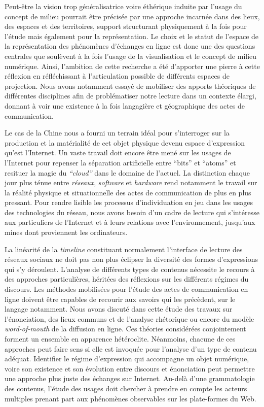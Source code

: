 Peut-être la vision trop généralisatrice voire éthérique induite par l{\textquoteright}usage du concept de milieu pourrait être précisée par une approche incarnée dans des lieux, des espaces et des territoires, support structurant physiquement à la fois pour l{\textquoteright}étude mais également pour la représentation. Le choix et le statut de l'espace de la représentation des phénomènes d'échanges en ligne est donc une des questions centrales que soulèvent à la fois l'usage de la visualisation et le concept de milieu numérique. Ainsi, l'ambition de cette recherche a été d'apporter une pierre à cette réflexion en réfléchissant à l'articulation possible de différents espaces de projection. Nous avons notamment essayé de mobiliser des apports théoriques de différentes disciplines afin de problématiser notre lecture dans un contexte élargi, donnant à voir une existence à la fois langagière et géographique des actes de communication. 


Le cas de la Chine nous a fourni un terrain idéal pour s'interroger sur la production et la matérialité de cet objet physique devenu espace d'expression qu'est l'Internet. Un vaste travail doit encore être mené sur les usages de l'Internet pour repenser  la séparation artificielle entre ``bits'' et ``atoms'' et resituer la magie du \textit{``cloud''} dans le domaine de l'actuel. La distinction chaque jour plus ténue entre \textit{réseaux}, \textit{software} et \textit{hardware} rend notamment le travail sur la réalité physique et situationnelle des actes de communication de plus en plus pressant. Pour rendre lisible les processus d'individuation en jeu dans les usages des technologies du réseau, nous avons besoin d'un cadre de lecture qui s'intéresse aux particuliers de l'Internet et à leurs relations avec l'environnement, jusqu'aux mines dont proviennent les ordinateurs.

La linéarité de la \textit{timeline} constituant normalement l'interface de lecture des réseaux sociaux ne doit pas non plus éclipser la diversité des formes d'expressions qui s'y déroulent. L'analyse de différents types de contenus nécessite le recours à des approches particulières, héritées des réflexions sur les différents régimes du discours. Les méthodes mobilisées pour l'étude des actes de communication en ligne doivent être capables de recourir aux savoirs qui les précèdent, sur le langage notamment. Nous avons discuté dans cette étude des travaux sur l'énonciation, des lieux communs et de l'analyse rhétorique ou encore du modèle \textit{word-of-mouth} de la diffusion en ligne. Ces théories considérées conjointement forment un ensemble en apparence hétéroclite. Néanmoins, chacune de ces approches peut faire sens si elle est invoquée pour l'analyse d'un type de contenu adéquat. Identifier le régime d'expression qui accompagne un objet numérique, voire son existence et son évolution entre discours et énonciation peut permettre une approche plus juste des échanges sur Internet. Au-delà d'une grammatologie des contenus, l'étude des usages doit chercher à prendre en compte les acteurs multiples prenant part aux phénomènes observables sur les plate-formes du Web. 

